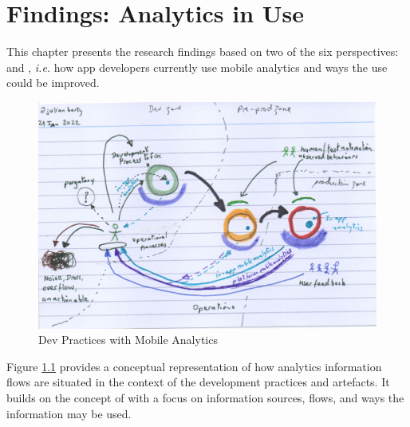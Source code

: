 \setchapterpreamble[u]{\margintoc}
\chapter{Findings: Analytics in Use}

This chapter presents the research findings based on two of the six perspectives: \uuse and \iuse, \emph{i.e.} how app developers currently use mobile analytics and ways the use could be improved. 

\begin{figure}
    \centering
    \includegraphics[width=\linewidth]{images/rough-sketches/dev-practices-with-mobile-analytics-24-jan-2022.jpeg}
    \caption{Dev Practices with Mobile Analytics}
    \label{fig:dev-practices-with-mobile-analytics}
\end{figure}

Figure \ref{fig:dev-practices-with-mobile-analytics} provides a conceptual representation of how analytics information flows are situated in the context of the development practices and artefacts. %
It builds on the concept of  with a focus on information sources, flows, and ways the information may be used.

